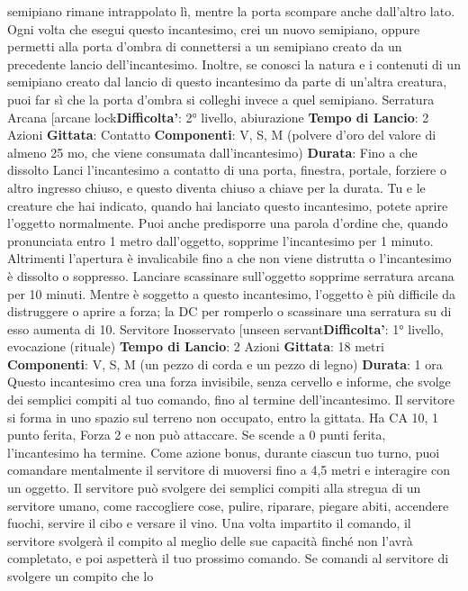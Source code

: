 \begin{multicols}{2}
semipiano rimane intrappolato lì, mentre la porta
scompare anche dall’altro lato.
Ogni volta che esegui questo incantesimo, crei un
nuovo semipiano, oppure permetti alla porta d’ombra di
connettersi a un semipiano creato da un precedente
lancio dell’incantesimo. Inoltre, se conosci la natura e i
contenuti di un semipiano creato dal lancio di questo
incantesimo da parte di un’altra creatura, puoi far sì che
la porta d’ombra si colleghi invece a quel semipiano.
Serratura Arcana
[arcane lock\textbf{Difficolta'}:
2° livello, abiurazione
\textbf{Tempo di Lancio}: 2 Azioni
\textbf{Gittata}: Contatto
\textbf{Componenti}: V, S, M (polvere d’oro del valore di
almeno 25 mo, che viene consumata dall’incantesimo)
\textbf{Durata}: Fino a che dissolto
Lanci l’incantesimo a contatto di una porta, finestra,
portale, forziere o altro ingresso chiuso, e questo
diventa chiuso a chiave per la durata. Tu e le creature
che hai indicato, quando hai lanciato questo
incantesimo, potete aprire l’oggetto normalmente. Puoi
anche predisporre una parola d’ordine che, quando
pronunciata entro 1 metro dall’oggetto, sopprime
l’incantesimo per 1 minuto. Altrimenti l’apertura è
invalicabile fino a che non viene distrutta o
l’incantesimo è dissolto o soppresso. Lanciare
scassinare sull’oggetto sopprime serratura arcana per
10 minuti.
Mentre è soggetto a questo incantesimo, l’oggetto è più
difficile da distruggere o aprire a forza; la DC per
romperlo o scassinare una serratura su di esso
aumenta di 10.
Servitore Inosservato
[unseen servant\textbf{Difficolta'}:
1° livello, evocazione (rituale)
\textbf{Tempo di Lancio}: 2 Azioni
\textbf{Gittata}: 18 metri
\textbf{Componenti}: V, S, M (un pezzo di corda e un pezzo di
legno)
\textbf{Durata}: 1 ora
Questo incantesimo crea una forza invisibile, senza
cervello e informe, che svolge dei semplici compiti al
tuo comando, fino al termine dell’incantesimo. Il
servitore si forma in uno spazio sul terreno non
occupato, entro la gittata. Ha CA 10, 1 punto ferita,
Forza 2 e non può attaccare. Se scende a 0 punti ferita,
l’incantesimo ha termine.
Come azione bonus, durante ciascun tuo turno, puoi
comandare mentalmente il servitore di muoversi fino a
4,5 metri e interagire con un oggetto. Il servitore può
svolgere dei semplici compiti alla stregua di un servitore
umano, come raccogliere cose, pulire, riparare, piegare
abiti, accendere fuochi, servire il cibo e versare il vino.
Una volta impartito il comando, il servitore svolgerà il
compito al meglio delle sue capacità finché non l’avrà
completato, e poi aspetterà il tuo prossimo comando.
Se comandi al servitore di svolgere un compito che lo

\end{multicols}
